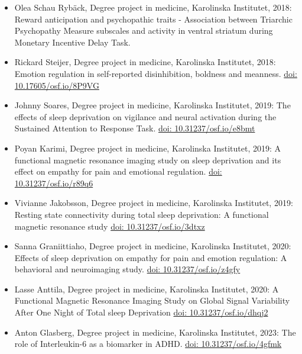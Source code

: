 \documentclass[10pt,a4paper,twocolumn]{article}
\begin{document}
\begin{itemize}
\begin{itemize}
        \item Olea Schau Rybäck, Degree project in medicine, Karolinska Institutet, 2018: Reward anticipation and psychopathic traits - Association between Triarchic Psychopathy Measure subscales and activity in ventral striatum during Monetary Incentive Delay Task.

        \item Rickard Steijer, Degree project in medicine, Karolinska Institutet, 2018: Emotion regulation in self-reported disinhibition, boldness and meanness. \href{https://doi.org/10.17605/osf.io/8P9VG}{doi: 10.17605/osf.io/8P9VG}

        \item Johnny Soares, Degree project in medicine, Karolinska Institutet, 2019: The effects of sleep deprivation on vigilance and neural activation during the Sustained Attention to Response Task. \href{https://doi.org/10.31237/osf.io/e8bmt}{doi: 10.31237/osf.io/e8bmt}

        \item Poyan Karimi, Degree project in medicine, Karolinska Institutet, 2019: A functional magnetic resonance imaging study on sleep deprivation and its effect on empathy for pain and emotional regulation. \href{https://doi.org/10.31237/osf.io/r89q6}{doi: 10.31237/osf.io/r89q6}

        \item Vivianne Jakobsson, Degree project in medicine, Karolinska Institutet, 2019: Resting state connectivity during total sleep deprivation: A functional magnetic resonance study \href{https://doi.org/10.31237/osf.io/3dtxz}{doi: 10.31237/osf.io/3dtxz}

        \item Sanna Graniittiaho, Degree project in medicine, Karolinska Institutet, 2020: Effects of sleep deprivation on empathy for pain and emotion regulation: A behavioral and neuroimaging study. \href{https://doi.org/10.31237/osf.io/z4gfy}{doi: 10.31237/osf.io/z4gfy}

        \item Lasse Anttila, Degree project in medicine, Karolinska Institutet, 2020: A Functional Magnetic Resonance Imaging Study on Global Signal Variability After One Night of Total sleep Deprivation \href{https://doi.org/10.31237/osf.io/dhqj2}{doi: 10.31237/osf.io/dhqj2}

        \item Anton Glasberg, Degree project in medicine, Karolinska Institutet, 2023: The role of Interleukin-6 as a biomarker in ADHD. \href{https://doi.org/10.31237/osf.io/4gfmk}{doi: 10.31237/osf.io/4gfmk}


\end{itemize}
\end{itemize}
\end{document}
